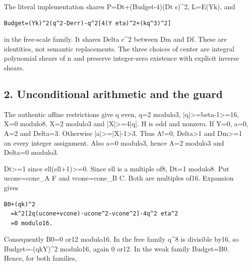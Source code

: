The literal implementation shares P=\allowbreak{}Dt+\allowbreak{}(Budget-4)(Dt s)\textasciicircum{}\allowbreak{}2, L=\allowbreak{}E(Yk), and



\begin{verbatim}
Budget=(Yk)^2(q^2-Derr)-q^2[4(Y eta)^2+(kq^3)^2]
\end{verbatim}

in the free-scale family. It shares Delta c\textasciicircum{}\allowbreak{}2 between Dm and Df. These are identities, not semantic replacements. The three choices of center are integral polynomial shears of n and preserve integer-zero existence with explicit inverse shears.



\subsection{2. Unconditional arithmetic and the guard}



The authentic affine restrictions give q even, q=\allowbreak{}2 modulo3, |q|\textgreater{}\allowbreak{}=\allowbreak{}beta-1\textgreater{}\allowbreak{}=\allowbreak{}16, X=\allowbreak{}0 modulo8, X=\allowbreak{}2 modulo3 and |X|\textgreater{}\allowbreak{}=\allowbreak{}4|q|. H is odd and nonzero. If Y=\allowbreak{}0, a=\allowbreak{}0, A=\allowbreak{}2 and Delta=\allowbreak{}3. Otherwise |a|\textgreater{}\allowbreak{}=\allowbreak{}|X|-1\textgreater{}\allowbreak{}3. Thus A!=\allowbreak{}0, Delta\textgreater{}\allowbreak{}1 and Dm\textgreater{}\allowbreak{}=\allowbreak{}1 on every integer assignment. Also a=\allowbreak{}0 modulo3, hence A=\allowbreak{}2 modulo3 and Delta=\allowbreak{}0 modulo3.



Dt\textgreater{}\allowbreak{}=\allowbreak{}1 since ell(ell+\allowbreak{}1)\textgreater{}\allowbreak{}=\allowbreak{}0. Since ell is a multiple of8, Dt=\allowbreak{}1 modulo8. Put ucone=\allowbreak{}cone\_\allowbreak{}A F and vcone=\allowbreak{}cone\_\allowbreak{}B C. Both are multiples of16. Expansion gives



\begin{verbatim}
B0+(qk)^2
  =k^2[2q(ucone+vcone)-ucone^2-vcone^2]-4q^2 eta^2
  =0 modulo16.
\end{verbatim}

Consequently B0=\allowbreak{}0 or12 modulo16. In the free family q\textasciicircum{}\allowbreak{}8 is divisible by16, so Budget=\allowbreak{}-(qkY)\textasciicircum{}\allowbreak{}2 modulo16, again 0 or12. In the weak family Budget=\allowbreak{}B0. Hence, for both families,



